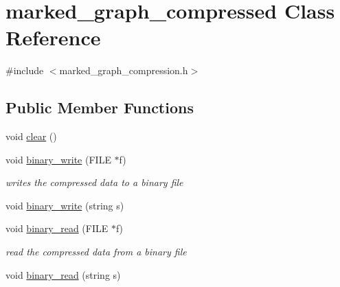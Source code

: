 \hypertarget{classmarked__graph__compressed}{}\section{marked\+\_\+graph\+\_\+compressed Class Reference}
\label{classmarked__graph__compressed}


{\ttfamily \#include $<$marked\+\_\+graph\+\_\+compression.\+h$>$}

\subsection*{Public Member Functions}
\begin{DoxyCompactItemize}
\item 
void \hyperlink{classmarked__graph__compressed_af58307bfadcaa4c3ca6dd594c2f9b3a9}{clear} ()
\item 
void \hyperlink{classmarked__graph__compressed_ab9cdb7fc43badd58fb5202f74ffac723}{binary\+\_\+write} (F\+I\+LE $\ast$f)
\begin{DoxyCompactList}\small\item\em writes the compressed data to a binary file \end{DoxyCompactList}\item 
void \hyperlink{classmarked__graph__compressed_a13ab09e4b399f179ec91746ae2b8b38c}{binary\+\_\+write} (string s)
\item 
void \hyperlink{classmarked__graph__compressed_a9db2d11bd63ad3d5a75e47b4023a89dd}{binary\+\_\+read} (F\+I\+LE $\ast$f)
\begin{DoxyCompactList}\small\item\em read the compressed data from a binary file \end{DoxyCompactList}\item 
void \hyperlink{classmarked__graph__compressed_a01c67fe4234738db6bb60459515c3ad8}{binary\+\_\+read} (string s)
\end{DoxyCompactItemize}
